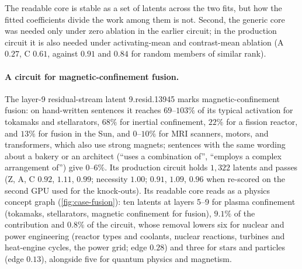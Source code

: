 \documentclass[10pt]{article}
\begin{document}
The readable core is stable as a set of latents across the two fits, but how the fitted coefficients divide the work among them is not.
Second, the generic core was needed only under zero ablation in the earlier circuit; in the production circuit it is also needed under activating-mean and contrast-mean ablation (A $0.27$, C $0.61$, against $0.91$ and $0.84$ for random members of similar rank).

\paragraph{A circuit for magnetic-confinement fusion.}
The layer-9 residual-stream latent 9.resid.13945 marks magnetic-confinement fusion: on hand-written sentences it reaches $69$--$103\%$ of its typical activation for tokamaks and stellarators, $68\%$ for inertial confinement, $22\%$ for a fission reactor, and $13\%$ for fusion in the Sun, and $0$--$10\%$ for MRI scanners, motors, and transformers, which also use strong magnets; sentences with the same wording about a bakery or an architect (``uses a combination of'', ``employs a complex arrangement of'') give $0$--$6\%$.
Its production circuit holds $1{,}322$ latents and passes (Z, A, C $0.92$, $1.11$, $0.99$; necessity $1.00$; $0.91$, $1.09$, $0.96$ when re-scored on the second GPU used for the knock-outs).
Its readable core reads as a physics concept graph (\cref{fig:case-fusion}): ten latents at layers 5--9 for plasma confinement (tokamaks, stellarators, magnetic confinement for fusion), $9.1\%$ of the contribution and $0.8\%$ of the circuit, whose removal lowers six for nuclear and power engineering (reactor types and coolants, nuclear reactions, turbines and heat-engine cycles, the power grid; edge $0.28$) and three for stars and particles (edge $0.13$), alongside five for quantum physics and magnetism.
\end{document}
